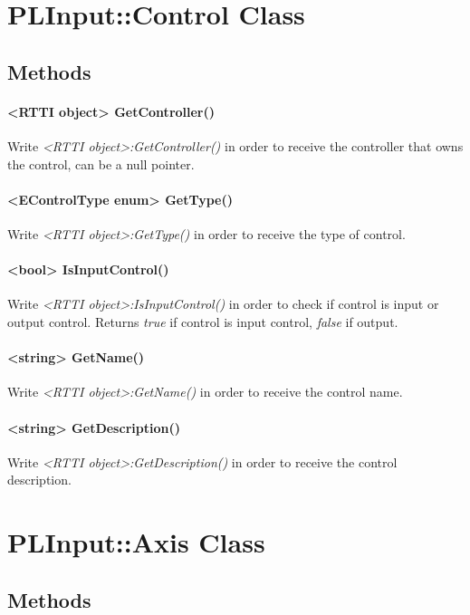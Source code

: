 \section{PLInput::Control Class}


\subsection{Methods}

\paragraph{<RTTI object> GetController()}
Write \emph{<RTTI object>:GetController()} in order to receive the controller that owns the control, can be a null pointer.

\paragraph{<EControlType enum> GetType()}
Write \emph{<RTTI object>:GetType()} in order to receive the type of control.

\paragraph{<bool> IsInputControl()}
Write \emph{<RTTI object>:IsInputControl()} in order to check if control is input or output control. Returns \emph{true} if control is input control, \emph{false} if output.

\paragraph{<string> GetName()}
Write \emph{<RTTI object>:GetName()} in order to receive the control name.

\paragraph{<string> GetDescription()}
Write \emph{<RTTI object>:GetDescription()} in order to receive the control description.




\section{PLInput::Axis Class}


\subsection{Methods}

